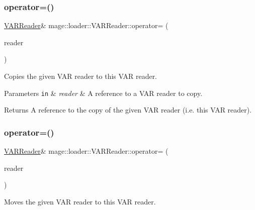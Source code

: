 \subsubsection{\texorpdfstring{operator=()}{operator=()}\hspace{0.1cm}{\footnotesize\ttfamily [1/2]}}
{\footnotesize\ttfamily \mbox{\hyperlink{classmage_1_1loader_1_1_v_a_r_reader}{V\+A\+R\+Reader}}\& mage\+::loader\+::\+V\+A\+R\+Reader\+::operator= (\begin{DoxyParamCaption}\item[{const \mbox{\hyperlink{classmage_1_1loader_1_1_v_a_r_reader}{V\+A\+R\+Reader}} \&}]{reader }\end{DoxyParamCaption})\hspace{0.3cm}{\ttfamily [delete]}}

Copies the given V\+AR reader to this V\+AR reader.


\begin{DoxyParams}[1]{Parameters}
\mbox{\tt in}  & {\em reader} & A reference to a V\+AR reader to copy. \\
\hline
\end{DoxyParams}
\begin{DoxyReturn}{Returns}
A reference to the copy of the given V\+AR reader (i.\+e. this V\+AR reader). 
\end{DoxyReturn}
\mbox{\label{classmage_1_1loader_1_1_v_a_r_reader_a0da01229f594cb701b3e20d53be9d16e}} 
\subsubsection{\texorpdfstring{operator=()}{operator=()}\hspace{0.1cm}{\footnotesize\ttfamily [2/2]}}
{\footnotesize\ttfamily \mbox{\hyperlink{classmage_1_1loader_1_1_v_a_r_reader}{V\+A\+R\+Reader}}\& mage\+::loader\+::\+V\+A\+R\+Reader\+::operator= (\begin{DoxyParamCaption}\item[{\mbox{\hyperlink{classmage_1_1loader_1_1_v_a_r_reader}{V\+A\+R\+Reader}} \&\&}]{reader }\end{DoxyParamCaption})\hspace{0.3cm}{\ttfamily [delete]}}

Moves the given V\+AR reader to this V\+AR reader.


